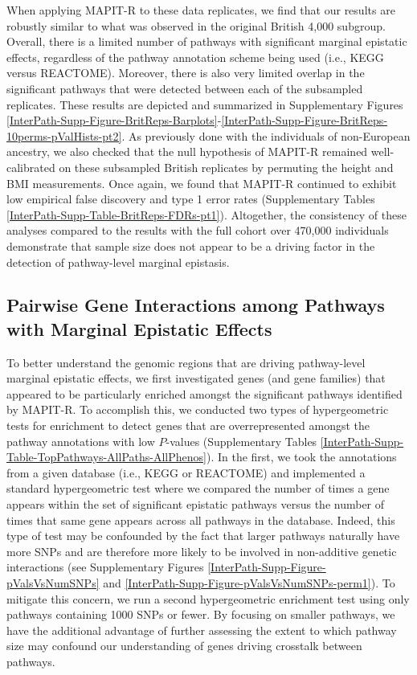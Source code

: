 \documentclass[10pt,a4paper]{article}
\begin{document}
When applying MAPIT-R to these data replicates, we find that our results are robustly similar to what was observed in the original British 4,000 subgroup. Overall, there is a limited number of pathways with significant marginal epistatic effects, regardless of the pathway annotation scheme being used (i.e., KEGG versus REACTOME). Moreover, there is also very limited overlap in the significant pathways that were detected between each of the subsampled replicates. These results are depicted and summarized in Supplementary Figures \ref{InterPath-Supp-Figure-BritReps-Barplots}-\ref{InterPath-Supp-Figure-BritReps-10perms-pValHists-pt2}. As previously done with the individuals of non-European ancestry, we also checked that the null hypothesis of MAPIT-R remained well-calibrated on these subsampled British replicates by permuting the height and BMI measurements. Once again, we found that MAPIT-R continued to exhibit low empirical false discovery and type 1 error rates (Supplementary Tables \ref{InterPath-Supp-Table-BritReps-FDRs-pt1}). Altogether, the consistency of these analyses compared to the results with the full cohort over 470,000 individuals demonstrate that sample size does not appear to be a driving factor in the detection of pathway-level marginal epistasis.

\subsection*{Pairwise Gene Interactions among Pathways with Marginal Epistatic Effects}

To better understand the genomic regions that are driving pathway-level marginal epistatic effects, we first investigated genes (and gene families) that appeared to be particularly enriched amongst the significant pathways identified by MAPIT-R. To accomplish this, we conducted two types of hypergeometric tests for enrichment to detect genes that are overrepresented amongst the pathway annotations with low $P$-values (Supplementary Tables \ref{InterPath-Supp-Table-TopPathways-AllPaths-AllPhenos}). In the first, we took the annotations from a given database (i.e., KEGG or REACTOME) and implemented a standard hypergeometric test where we compared the number of times a gene appears within the set of significant epistatic pathways versus the number of times that same gene appears across all pathways in the database. Indeed, this type of test may be confounded by the fact that larger pathways naturally have more SNPs and are therefore more likely to be involved in non-additive genetic interactions (see Supplementary Figures \ref{InterPath-Supp-Figure-pValsVsNumSNPs} and \ref{InterPath-Supp-Figure-pValsVsNumSNPs-perm1}). To mitigate this concern, we run a second hypergeometric enrichment test using only pathways containing 1000 SNPs or fewer. By focusing on smaller pathways, we have the additional advantage of further assessing the extent to which pathway size may confound our understanding of genes driving crosstalk between pathways. 
\end{document}
